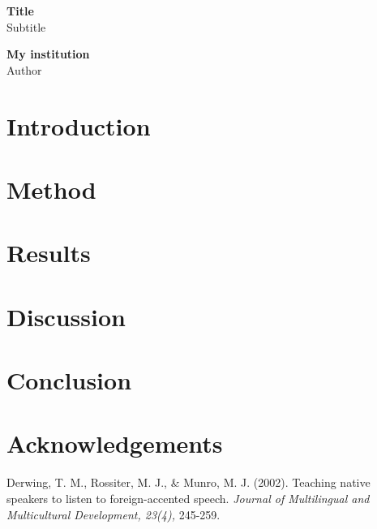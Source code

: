 \documentclass[12pt,a4paper]{article}
\title{\mytitle}
\newcommand{\mytitle}{Title}
\newcommand{\mysubtitle}{Subtitle}
\newcommand{\myauthor}{Author}
\newcommand{\myinstitution}{My institution}
\begin{document}
\doublespacing

\begin{titlepage}
   \begin{center}
       \vspace*{1cm}

       \textbf{\mytitle} \\
       \mysubtitle \\

       \vspace{1.5cm}
       
       \textbf{\myinstitution} \\
       \myauthor

       \vfill
            
       \vspace{0.8cm}
            
   \end{center}
\end{titlepage}

\begin{abstract}
\end{abstract}

\section*{Introduction}

\section*{Method}

\section*{Results}

\section*{Discussion}

\section*{Conclusion}

\section*{Acknowledgements}

\begin{thebibliography}{9}

Derwing, T. M., Rossiter, M. J., \& Munro, M. J. (2002). Teaching native speakers to listen to foreign-accented speech. \textit{Journal of Multilingual and Multicultural Development, 23(4),} 245-259.

\end{thebibliography}
\end{document}
